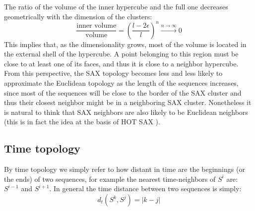 \documentclass[a4paper,twoside]{article}
\begin{document}
%
The ratio of the volume of the inner hypercube and the full one decreases geometrically with the dimension of the clusters:
$$
\frac{\mbox{inner volume}}{\mbox{volume}} = \left( \frac{l-2\epsilon}{l} \right)^n  
\xrightarrow[]{n\rightarrow \infty} 0 
$$
This implies that, as the dimensionality grows, most of the volume is located in the external shell of the hypercube. A point belonging to this region must be close to at least one of its faces, and thus it is close to a neighbor hypercube.
%
%
From this perspective, the SAX topology becomes less and less likely to approximate the Euclidean topology as the length of the sequences increases, since most of the sequences will be close to the border of the SAX cluster and thus their closest neighbor might be in a neighboring SAX cluster.
%
Nonetheless it is natural to think that SAX neighbors are also likely to be Euclidean neighbors (this is in fact the idea at the basis of HOT SAX \cite{hotsax}).


\subsection{Time topology}\label{ssec:timeTopology}
By time topology we simply refer to how distant in time are the beginnings (or the ends) of two sequences, for example the nearest time-neighbors of ${S^i}$ are: ${S^{i-1}}$ and ${S^{i+1}}$.
%
In general the time distance between two sequences is simply:
\begin{equation}
 d_t({S^k}, {S^j})= |k-j|
\end{equation}
\end{document}
